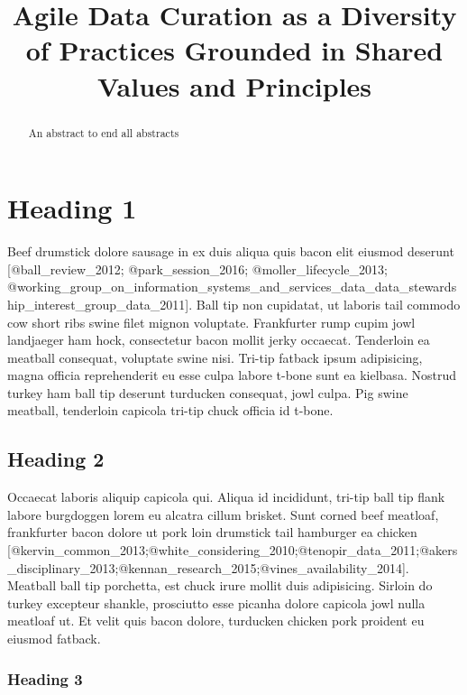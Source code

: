 \documentclass[paper]{ijdc-v9}
\title[Agile Data Curation]{Agile Data Curation as a Diversity of Practices Grounded in Shared
Values and Principles}
\begin{document}
\maketitle

\begin{abstract}
An abstract to end all abstracts
\end{abstract}

\section{Heading 1}\label{heading-1}

Beef drumstick dolore sausage in ex duis aliqua quis bacon elit eiusmod
deserunt {[}@ball\_review\_2012; @park\_session\_2016;
@moller\_lifecycle\_2013;
@working\_group\_on\_information\_systems\_and\_services\_data\_data\_stewardship\_interest\_group\_data\_2011{]}.
Ball tip non cupidatat, ut laboris tail commodo cow short ribs swine
filet mignon voluptate. Frankfurter rump cupim jowl landjaeger ham hock,
consectetur bacon mollit jerky occaecat. Tenderloin ea meatball
consequat, voluptate swine nisi. Tri-tip fatback ipsum adipisicing,
magna officia reprehenderit eu esse culpa labore t-bone sunt ea
kielbasa. Nostrud turkey ham ball tip deserunt turducken consequat, jowl
culpa. Pig swine meatball, tenderloin capicola tri-tip chuck officia id
t-bone.

\subsection{Heading 2}\label{heading-2}

Occaecat laboris aliquip capicola qui. Aliqua id incididunt, tri-tip
ball tip flank labore burgdoggen lorem eu alcatra cillum brisket. Sunt
corned beef meatloaf, frankfurter bacon dolore ut pork loin drumstick
tail hamburger ea chicken
{[}@kervin\_common\_2013;@white\_considering\_2010;@tenopir\_data\_2011;@akers\_disciplinary\_2013;@kennan\_research\_2015;@vines\_availability\_2014{]}.
Meatball ball tip porchetta, est chuck irure mollit duis adipisicing.
Sirloin do turkey excepteur shankle, prosciutto esse picanha dolore
capicola jowl nulla meatloaf ut. Et velit quis bacon dolore, turducken
chicken pork proident eu eiusmod fatback.

\subsubsection{Heading 3}\label{heading-3}
\end{document}
